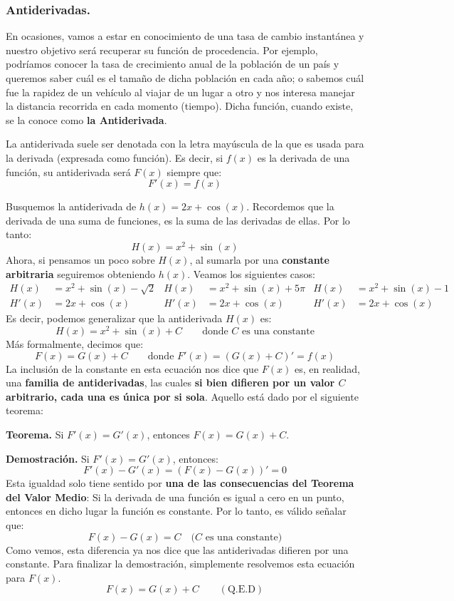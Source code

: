 \documentclass[12pt]{article}
\begin{document}
\subsubsection{Antiderivadas.}

En ocasiones, vamos a estar en conocimiento de una tasa de cambio instantánea y nuestro objetivo será recuperar su función de procedencia. Por ejemplo, podríamos conocer la tasa de crecimiento anual de la población de un país y queremos saber cuál es el tamaño de dicha población en cada año; o sabemos cuál fue la rapidez de un vehículo al viajar de un lugar a otro y nos interesa manejar la distancia recorrida en cada momento (tiempo). Dicha función, cuando existe, se la conoce como \textbf{la Antiderivada}.

La antiderivada suele ser denotada con la letra mayúscula de la que es usada para la derivada (expresada como función). Es decir, si $f(x)$ es la derivada de una función, su antiderivada será $F(x)$ siempre que:
\[
  F'(x) = f(x)
\]

\newpage

Busquemos la antiderivada de $h(x) = 2x + \cos(x)$. Recordemos que la derivada de una suma de funciones, es la suma de las derivadas de ellas. Por lo tanto:
\[
  H(x) = x^{2} + \sin(x)
\]
Ahora, si pensamos un poco sobre $H(x)$, al sumarla por una \textbf{constante arbitraria} seguiremos obteniendo $h(x)$. Veamos los siguientes casos:
\begin{align*}
H(x) &= x^{2} + \sin(x) - \sqrt{2} & H(x) &= x^{2} + \sin(x) + 5\pi & H(x) &= x^{2} + \sin(x) - 1 \\
H'(x) &= 2x + \cos(x) & H'(x) &= 2x + \cos(x) & H'(x) &= 2x + \cos(x)
\end{align*}
Es decir, podemos generalizar que la antiderivada $H(x)$ es:
\[
  H(x) = x^{2} + \sin(x) + C \qquad \text{donde } C \text{ es una constante}
\]
Más formalmente, decimos que:
\[
  F(x) = G(x) + C \qquad \text{donde } F'(x) = \left(G(x) + C\right)' = f(x)
\]
La inclusión de la constante en esta ecuación nos dice que $F(x)$ es, en realidad, una \textbf{familia de antiderivadas}, las cuales \textbf{si bien difieren por un valor $C$ arbitrario, cada una es única por si sola}. Aquello está dado por el siguiente teorema:

\textbf{Teorema.} \quad Si $F'(x) = G'(x)$, entonces $F(x) = G(x) + C$.

\textbf{Demostración.} \quad Si $F'(x) = G'(x)$, entonces:
\[
  F'(x) - G'(x) = \left(F(x) - G(x)\right)' = 0
\]
Esta igualdad solo tiene sentido por \textbf{una de las consecuencias del Teorema del Valor Medio}: Si la derivada de una función es igual a cero en un punto, entonces en dicho lugar la función es constante. Por lo tanto, es válido señalar que:
\[
  F(x) - G(x) = C \quad \text{(} C \text{ es una constante)}
\]
Como vemos, esta diferencia ya nos dice que las antiderivadas difieren por una constante. Para finalizar la demostración, simplemente resolvemos esta ecuación para $F(x)$.
\[
  F(x) = G(x) + C \qquad (\text{Q.E.D})
\]
\end{document}

